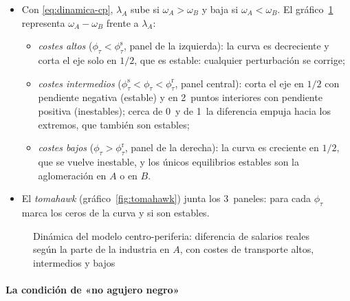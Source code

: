 \documentclass[11pt]{article}
\begin{document}
\begin{itemize}
\item Con \eqref{eq:dinamica-cp}, $\lambda_A$ sube si $\omega_A>\omega_B$ y baja si $\omega_A<\omega_B$. El gráfico~\ref{fig:centro-periferia-dinamica} representa $\omega_A-\omega_B$ frente a $\lambda_A$:
  \begin{itemize}
  \item \emph{costes altos} ($\phi_\tau<\phi_\tau^{\mathrm s}$, panel de la izquierda): la curva es decreciente y corta el eje solo en $1/2$, que es estable: cualquier perturbación se corrige;
  \item \emph{costes intermedios} ($\phi_\tau^{\mathrm s}<\phi_\tau<\phi_\tau^{\mathrm r}$, panel central): corta el eje en $1/2$ con pendiente negativa (estable) y en 2~puntos interiores con pendiente positiva (inestables); cerca de 0~y de 1~la diferencia empuja hacia los extremos, que también son estables;
  \item \emph{costes bajos} ($\phi_\tau>\phi_\tau^{\mathrm r}$, panel de la derecha): la curva es creciente en $1/2$, que se vuelve inestable, y los únicos equilibrios estables son la aglomeración en $A$ o en $B$.
  \end{itemize}
\item El \emph{tomahawk} (gráfico~\ref{fig:tomahawk}) junta los 3~paneles: para cada $\phi_\tau$ marca los ceros de la curva y si son estables.
\end{itemize}

\begin{figure}[H]
\centering
\caption{Dinámica del modelo centro-periferia: diferencia de salarios reales según la parte de la industria en $A$, con costes de transporte altos, intermedios y bajos}\label{fig:centro-periferia-dinamica}
\end{figure}

\paragraph{La condición de «no agujero negro»}
\end{document}
